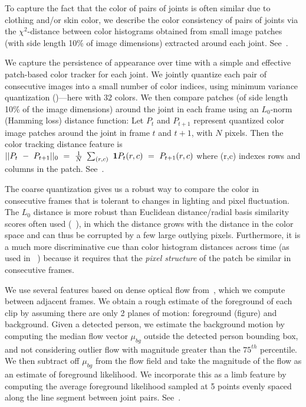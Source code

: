  To capture the fact that the color of pairs of 
joints is often similar due to clothing and/or skin color, we describe the 
color consistency of pairs of joints via the $\chi^2$-distance between color 
histograms obtained from small image patches (with side length 10\% of image 
dimensions) extracted around each joint.  See~.

  We capture the persistence of appearance over 
time with a simple and effective patch-based color tracker for each joint.  We 
jointly quantize each pair of consecutive images into a small number of color 
indices, using minimum variance quantization ()---here with 32 
colors.  We then compare patches (of side length 10\% of the image dimensions) 
around the joint in each frame using an $L_0$-norm (Hamming loss) distance 
function:  Let $P_{t}$ and $P_{t+1}$ represent quantized color image patches 
around the joint in frame $t$ and $t+1$, with $N$ pixels.  Then the color 
tracking distance feature is $ 
||P_t~-~P_{t+1}||_0~=~\frac{1}{N}~\sum_{(r,c)}~\mathbf{1}{P_{t}(r,c)~=~P_{t+1}(r,c)}$ 
where (r,c) indexes rows and columns in the patch.  
See~.

The coarse quantization gives us a robust way to compare the color in 
consecutive frames that is tolerant to changes in lighting and pixel 
fluctuation.  The $L_0$ distance is more robust than Euclidean distance/radial 
basis similarity scores often used (\eg~\citet{gould08ijcv}), in which the 
distance grows with the distance in the color space and can thus be corrupted 
by a few large outlying pixels.  Furthermore, it is a much more discriminative 
cue than color histogram distances across time (as used in \eg~\citet{ren07}) 
because it requires that the {\em pixel structure} of the patch be similar in 
consecutive frames.  

We use several features based on dense optical flow from~\cite{optflow}, which we compute between 
adjacent frames. We obtain a rough estimate of the foreground of each clip by 
assuming there are only 2 planes of motion: foreground (figure) and background.  
Given a detected person, we estimate the background motion by computing the 
median flow vector $\mu_{bg}$ outside the detected person bounding box, and not 
considering outlier flow with magnitude greater than the $75^{th}$ percentile.  
We then subtract off $\mu_{bg}$ from the flow field and take the magnitude of 
the flow as an estimate of foreground likelihood.  We incorporate this as a
limb feature by computing the average foreground likelihood sampled at 5 points 
evenly spaced along the line segment between joint pairs.
See~.

